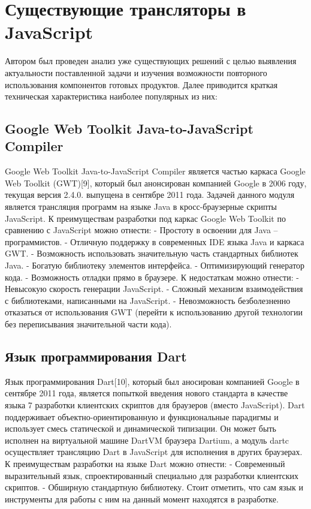 \section{Существующие трансляторы в JavaScript}

Автором был проведен анализ уже существующих решений с целью выявления
актуальности поставленной задачи и изучения возможности повторного использования
компонентов готовых продуктов. Далее приводится краткая техническая характеристика
наиболее популярных из них:

\subsection{Google Web Toolkit Java-to-JavaScript Compiler}

Google Web Toolkit Java-to-JavaScript Compiler является частью каркаса Google Web
Toolkit (GWT)[9], который был анонсирован компанией Google в 2006 году, текущая версия
2.4.0. выпущена в сентябре 2011 года. Задачей данного модуля является трансляция
программ на языке Java в кросс-браузерные скрипты JavaScript.
К преимуществам разработки под каркас Google Web Toolkit по сравнению с
JavaScript можно отнести:
- Простоту в освоении для Java – программистов.
- Отличную поддержку в современных IDE языка Java и каркаса GWT.
- Возможность использовать значительную часть стандартных библиотек Java.
- Богатую библиотеку элементов интерфейса.
- Оптимизирующий генератор кода.
- Возможность отладки прямо в браузере.
К недостаткам можно отнести:
- Невысокую скорость генерации JavaScript.
- Сложный механизм взаимодействия с библиотеками, написанными на
JavaScript.
-
Невозможность безболезненно отказаться от использования GWT (перейти к
использованию другой технологии без переписывания значительной части
кода).

\subsection{Язык программирования Dart}

Язык программирования Dart[10], который был аносирован компанией Google в
сентябре 2011 года, является попыткой введения нового стандарта в качестве языка
7
разработки клиентских скриптов для браузеров (вместо JavaScript). Dart поддерживает
объектно-ориентированную и функциональные парадигмы и использует смесь статической и
динамической типизации. Он может быть исполнен на виртуальной машине DartVM
браузера Dartium, а модуль dartc осуществляет трансляцию Dart в JavaScript для исполнения
в других браузерах.
К преимуществам разработки на языке Dart можно отнести:
-
Современный выразительный язык, спроектированный специально для
разработки клиентских скриптов.
-
Обширную стандартную библиотеку.
Стоит отметить, что сам язык и инструменты для работы с ним на данный момент
находятся в разработке.

